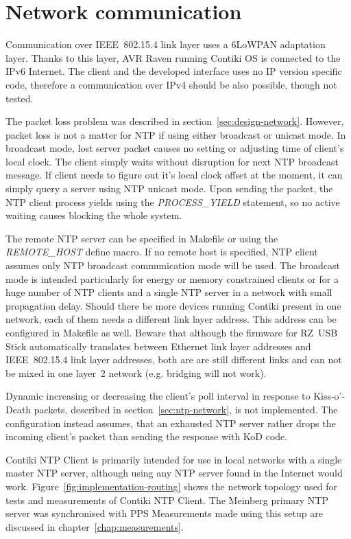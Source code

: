 
\section{Network communication}
Communication over IEEE~802.15.4 link layer uses a 6LoWPAN adaptation layer.
Thanks to this layer, AVR Raven running Contiki OS is connected to the IPv6 Internet.
The client and the developed interface uses no IP version specific code,
therefore a communication over IPv4 should be also possible, though not tested.

The packet loss problem was described in section~\ref{sec:design-network}.
However, packet loss is not a matter for NTP if using either broadcast or unicast mode.
In broadcast mode, lost server packet causes no setting or adjusting time of client's
local clock.
The client simply waits without disruption for next NTP broadcast message.
If client needs to figure out it's local clock offset at the moment,
it can simply query a server using NTP unicast mode.
Upon sending the packet, the NTP client process yields
using the {\it{PROCESS\_YIELD}} statement, so no active waiting
causes blocking the whole system.

The remote NTP server can be specified in Makefile or
using the {\it{REMOTE\_HOST}} define macro.
If no remote host is specified,
NTP client assumes only NTP broadcast communication mode will be used.
The broadcast mode is intended particularly for energy or memory constrained clients
or for a huge number of NTP clients and a single NTP server
in a network with small propagation delay.
Should there be more devices running Contiki present in one network,
each of them needs a different link layer address.
This address can be configured in Makefile as well.
Beware that although the firmware for RZ~USB Stick automatically translates
between Ethernet link layer addresses and IEEE~802.15.4 link layer
addresses, both are are still different links and can not be mixed in one
layer~2 network (e.g. bridging will not work).

Dynamic increasing or decreasing the client's poll interval in response to
Kiss-o'-Death packets, described in section~\ref{sec:ntp-network}, is not implemented.
The configuration instead assumes, that an exhausted NTP server rather drops the incoming
client's packet than sending the response with KoD code.

Contiki NTP Client is primarily intended for use in local networks with a single master NTP server,
although using any NTP server found in the Internet would work.
Figure~\ref{fig:implementation-routing} shows the network topology used
for tests and measurements of Contiki NTP Client.
The Meinberg primary NTP server was synchronised with PPS %
Measurements made using this setup are discussed in chapter~\ref{chap:measurements}.

